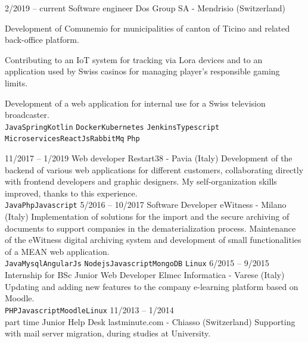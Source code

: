 \documentclass[9pt]{developercv} %
\begin{document}
\begin{entrylist}
	\entry
		{2/2019 -- current}
		{Software engineer}
		{Dos Group SA - Mendrisio (Switzerland)}
		{Development of Comunemio for municipalities of canton of Ticino and related back-office platform.

        Contributing to an IoT system for tracking via Lora devices and to an application used by Swiss casinos for managing player's responsible gaming limits.
        
        Development of a web application for internal use for a Swiss television broadcaster.\\ 
        \texttt{Java}\slashsep\texttt{Spring}\slashsep\texttt{Kotlin}
        \slashsep\texttt{Docker}\slashsep\texttt{Kubernetes}
        \slashsep\texttt{Jenkins}\slashsep\texttt{Typescript}\\
        \texttt{Microservices}\slashsep\texttt{ReactJs}\slashsep\texttt{RabbitMq}
        \slashsep\texttt{Php}}
	\entry
		{11/2017 -- 1/2019}
		{Web developer}
		{Restart38 - Pavia (Italy)}
		{Development of the backend of various web applications for different customers, collaborating directly with frontend developers and graphic designers.
        My self-organization skills improved, thanks to this experience.\\ \texttt{Java}\slashsep\texttt{Php}\slashsep\texttt{Javascript}}
	\entry
		{5/2016 -- 10/2017}
		{Software Developer}
		{eWitness - Milano (Italy)}
		{Implementation of solutions for the import and the secure archiving of documents to support companies in the dematerialization process.
        Maintenance of the eWitness digital archiving system and development of small functionalities of a MEAN web application.\\
        \texttt{Java}\slashsep\texttt{Mysql}\slashsep\texttt{AngularJs}
        \slashsep\texttt{Nodejs}\slashsep\texttt{Javascript}\slashsep\texttt{MongoDB}
        \slashsep\texttt{Linux}}
	\entry
		{6/2015 -- 9/2015\\\footnotesize{Internship for BSc}}
		{Junior Web Developer}
		{Elmec Informatica - Varese (Italy)}
		{Updating and adding new features to the company e-learning platform based on Moodle.\\
        \texttt{PHP}\slashsep\texttt{Javascript}\slashsep\texttt{Moodle}\slashsep\texttt{Linux}}
	\entry
		{11/2013 -- 1/2014\\\footnotesize{part time}}
		{Junior Help Desk}
		{lastminute.com - Chiasso (Switzerland)}
		{Supporting with mail server migration, during studies at University.}
\end{entrylist}
\end{document}
